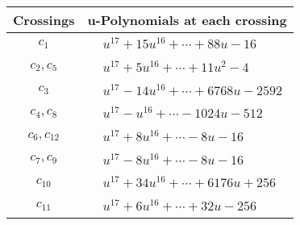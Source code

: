 \documentclass[1p]{elsarticle_modified}
\theoremstyle{definition}
\begin{document}
\begin{tabular}{m{50pt}|m{274pt}}
Crossings & \hspace{64pt}u-Polynomials at each crossing \\
\hline $$\begin{aligned}c_{1}\end{aligned}$$&$\begin{aligned}
&u^{17}+15 u^{16}+\cdots+88 u-16
\end{aligned}$\\
\hline $$\begin{aligned}c_{2},c_{5}\end{aligned}$$&$\begin{aligned}
&u^{17}+5 u^{16}+\cdots+11 u^2-4
\end{aligned}$\\
\hline $$\begin{aligned}c_{3}\end{aligned}$$&$\begin{aligned}
&u^{17}-14 u^{16}+\cdots+6768 u-2592
\end{aligned}$\\
\hline $$\begin{aligned}c_{4},c_{8}\end{aligned}$$&$\begin{aligned}
&u^{17}- u^{16}+\cdots-1024 u-512
\end{aligned}$\\
\hline $$\begin{aligned}c_{6},c_{12}\end{aligned}$$&$\begin{aligned}
&u^{17}+8 u^{16}+\cdots-8 u-16
\end{aligned}$\\
\hline $$\begin{aligned}c_{7},c_{9}\end{aligned}$$&$\begin{aligned}
&u^{17}-8 u^{16}+\cdots-8 u-16
\end{aligned}$\\
\hline $$\begin{aligned}c_{10}\end{aligned}$$&$\begin{aligned}
&u^{17}+34 u^{16}+\cdots+6176 u+256
\end{aligned}$\\
\hline $$\begin{aligned}c_{11}\end{aligned}$$&$\begin{aligned}
&u^{17}+6 u^{16}+\cdots+32 u-256
\end{aligned}$\\
\hline
\end{tabular}\\~\\
\end{document}
